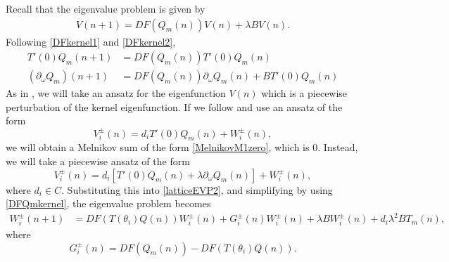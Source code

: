 \documentclass[12pt]{elsarticle}
\begin{document}
Recall that the eigenvalue problem is given by 
\begin{align}\label{latticeEVP2}
V(n+1) = DF(Q_m(n)) V(n) + \lambda B V(n).
\end{align}
Following \eqref{DFkernel1} and \eqref{DFkernel2}, 
\begin{equation}\label{DFQmkernel}
\begin{aligned}
T'(0)Q_m(n+1) &= DF(Q_m(n))T'(0)Q_m(n) \\
(\partial_\omega Q_m)(n+1) &= DF(Q_m(n))\partial_\omega Q_m(n) + B T'(0)Q_m(n)
\end{aligned}
\end{equation}
As in \cite{Sandstede1998}, we will take an ansatz for the eigenfunction $V(n)$ which is a piecewise perturbation of the kernel eigenfunction. If we follow \cite{Sandstede1998} and 
use an ansatz of the form 
\begin{equation*}
V_i^\pm(n) = 
d_i T'(0)Q_m(n) + W_i^\pm(n),
\end{equation*}
we will obtain a Melnikov sum of the form \eqref{MelnikovM1zero}, which is 0. Instead, we will take a piecewise ansatz of the form
\begin{equation}\label{Viansatz2}
V_i^\pm(n) = 
d_i [ T'(0)Q_m(n) + \lambda \partial_\omega Q_m(n) ] + W_i^\pm(n),
\end{equation}
where $d_i \in C$. Substituting this into \eqref{latticeEVP2}, and simplifying by using \eqref{DFQmkernel}, the eigenvalue problem becomes
\begin{align}\label{Weq1}
W_i^\pm(n+1)
&= DF(T(\theta_i) Q(n) ) W_i^\pm(n) + G_i^\pm(n)W_i^\pm(n) + \lambda B W_i^\pm(n) + d_i \lambda^2 B T_m(n),
\end{align}
where
\begin{equation}
G_i^\pm(n) = DF(Q_m(n)) - DF(T(\theta_i) Q(n) ).
\end{equation}
\end{document}
